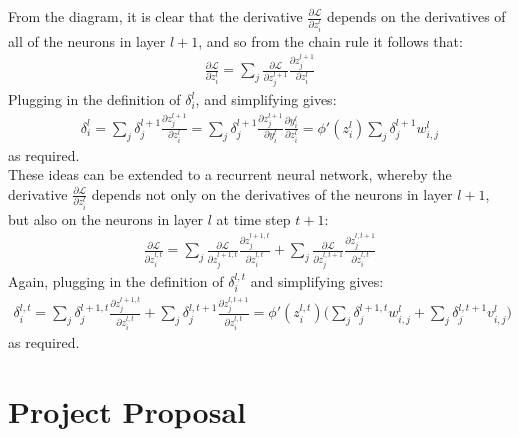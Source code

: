 \documentclass[a4paper, 12pt]{report}
\begin{document}
From the diagram, it is clear that the derivative $\frac{\partial \mathcal{L}}{\partial z_i^l}$ depends on the derivatives of all of the neurons in layer $l + 1$, and so from the chain rule it follows that:
\begin{gather*}
	\frac{\partial \mathcal{L}}{\partial z_i^l} = \sum_j \frac{\partial \mathcal{L}}{\partial z_j^{l + 1}}\frac{\partial z_j^{l + 1}}{\partial z_i^l}
\end{gather*}
Plugging in the definition of $\delta_i^l$, and simplifying gives:
\begin{gather*}
	\delta_i^l = \sum_j \delta_j^{l+1} \frac{\partial z_j^{l+1}}{\partial z_i^l} = \sum_j \delta_j^{l+1} \frac{\partial z_j^{l+1}}{\partial y_i^l} \frac{\partial y_i^l}{\partial z_i^l} = \phi'(z_i^l) \sum_j \delta_j^{l+1} w_{i,j}^l
\end{gather*}
as required. \\

These ideas can be extended to a recurrent neural network, whereby the derivative $\frac{\partial \mathcal{L}}{\partial z_i^l}$ depends not only on the derivatives of the neurons in layer $l + 1$, but also on the neurons in layer $l$ at time step $t + 1$:
\begin{gather*}
	\frac{\partial \mathcal{L}}{\partial z_i^{l, t}} = \sum_j \frac{\partial \mathcal{L}}{\partial z_j^{l + 1, t}}\frac{\partial z_j^{l + 1, t}}{\partial z_i^{l, t}} + \sum_j \frac{\partial \mathcal{L}}{\partial z_j^{l, t + 1}}\frac{\partial z_j^{l, t + 1}}{\partial z_i^{l, t}}
\end{gather*}
Again, plugging in the definition of $\delta_i^{l, t}$ and simplifying gives:
\begin{gather*}
	\delta_i^{l, t} = \sum_j \delta_j^{l+1, t} \frac{\partial z_j^{l+1, t}}{\partial z_i^{l, t}} + \sum_j \delta_j^{l, t + 1} \frac{\partial z_j^{l, t + 1}}{\partial z_i^{l, t}} = \phi'(z_i^{l,t}) \big( \sum_j \delta_j^{l+1,t} w_{i,j}^l + \sum_j \delta_j^{l,t+1} v_{i,j}^l \big)
\end{gather*}
as required.

\chapter{Project Proposal}

\printindex

\end{document}
